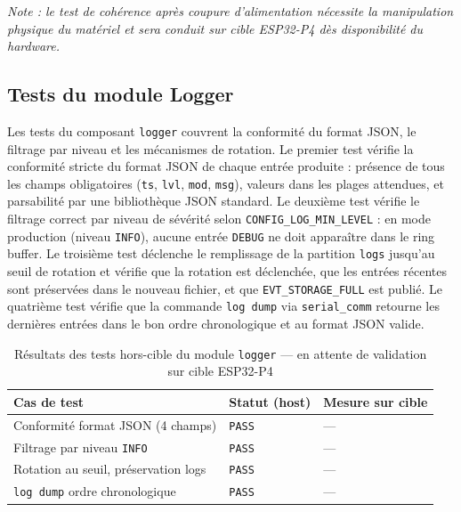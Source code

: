 \noindent\textit{Note : le test de cohérence après coupure d'alimentation
nécessite la manipulation physique du matériel et sera conduit sur cible
ESP32-P4 dès disponibilité du hardware.}

\subsection{Tests du module Logger}
\label{subsec:t_logger}

Les tests du composant \texttt{logger} couvrent la conformité du
format JSON, le filtrage par niveau et les mécanismes de rotation.
Le premier test vérifie la conformité stricte du format JSON de chaque
entrée produite : présence de tous les champs obligatoires (\texttt{ts},
\texttt{lvl}, \texttt{mod}, \texttt{msg}), valeurs dans les plages
attendues, et parsabilité par une bibliothèque JSON standard. Le
deuxième test vérifie le filtrage correct par niveau de sévérité
selon \texttt{CONFIG\_LOG\_MIN\_LEVEL} : en mode production (niveau
\texttt{INFO}), aucune entrée \texttt{DEBUG} ne doit apparaître dans
le ring buffer. Le troisième test déclenche le remplissage de la
partition \texttt{logs} jusqu'au seuil de rotation et vérifie que
la rotation est déclenchée, que les entrées récentes sont préservées
dans le nouveau fichier, et que \texttt{EVT\_STORAGE\_FULL} est
publié. Le quatrième test vérifie que la commande \texttt{log dump}
via \texttt{serial\_comm} retourne les dernières entrées dans le
bon ordre chronologique et au format JSON valide.

\begin{table}[H]
\centering
\renewcommand{\arraystretch}{1.5}
\caption{Résultats des tests hors-cible du module \texttt{logger} — en attente de validation sur cible ESP32-P4}
\label{tab:res_logger}
\small
\begin{tabular}{|p{5.5cm}|p{2.2cm}|p{3.8cm}|}
\hline
\rowcolor{gray!20}
\textbf{Cas de test} & \textbf{Statut (host)} & \textbf{Mesure sur cible} \\
\hline
Conformité format JSON (4 champs)    & \texttt{PASS} & — \\
\hline
Filtrage par niveau \texttt{INFO}    & \texttt{PASS} & — \\
\hline
Rotation au seuil, préservation logs & \texttt{PASS} & — \\
\hline
\texttt{log dump} ordre chronologique & \texttt{PASS} & — \\
\hline
\end{tabular}
\end{table}

